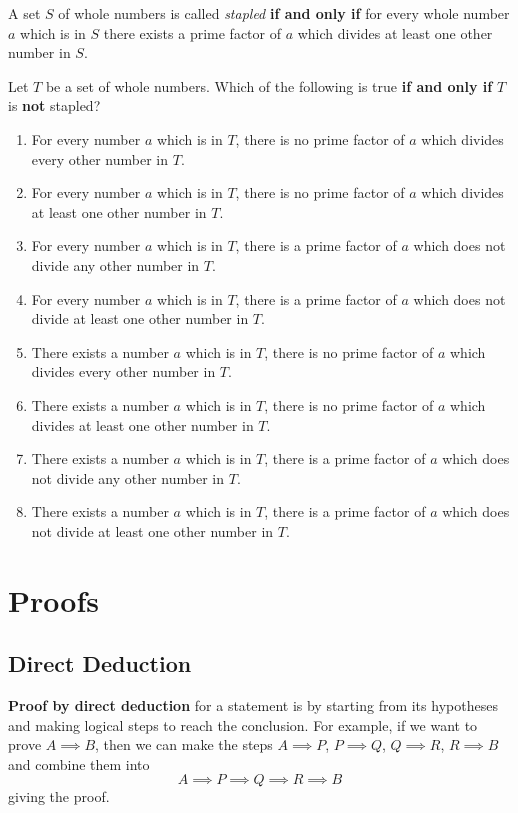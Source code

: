 \documentclass{article}
\begin{document}
\begin{example}[TMUA 2017 P2 Q17]
    A set \(S\) of whole numbers is called \emph{stapled} \textbf{if and only if} for every whole number \(a\) which is in \(S\) there exists a prime factor of \(a\) which divides at least one other number in \(S\).

    Let \(T\) be a set of whole numbers. Which of the following is true \textbf{if and only if} \(T\) is \textbf{not} stapled?

    \begin{enumerate}[label=\Alph*.]
        \item For every number \(a\) which is in \(T\), there is no prime factor of \(a\) which divides every other number in \(T\).
        \item For every number \(a\) which is in \(T\), there is no prime factor of \(a\) which divides at least one other number in \(T\).
        \item For every number \(a\) which is in \(T\), there is a prime factor of \(a\) which does not divide any other number in \(T\).
        \item For every number \(a\) which is in \(T\), there is a prime factor of \(a\) which does not divide at least one other number in \(T\).
        \item There exists a number \(a\) which is in \(T\), there is no prime factor of \(a\) which divides every other number in \(T\).
        \item There exists a number \(a\) which is in \(T\), there is no prime factor of \(a\) which divides at least one other number in \(T\).
        \item There exists a number \(a\) which is in \(T\), there is a prime factor of \(a\) which does not divide any other number in \(T\).
        \item There exists a number \(a\) which is in \(T\), there is a prime factor of \(a\) which does not divide at least one other number in \(T\).
    \end{enumerate}
\end{example}

\section{Proofs}
\subsection{Direct Deduction}

\textbf{Proof by direct deduction} for a statement is by starting from its hypotheses and making logical steps to reach the conclusion. For example, if we want to prove \(A \implies B\), then we can make the steps \(A \implies P\), \(P \implies Q\), \(Q \implies R\), \(R \implies B\) and combine them into
\[
    A \implies P \implies Q \implies R \implies B
\]
giving the proof.
\end{document}
